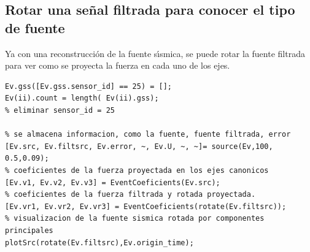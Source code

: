\subsection{Rotar una señal filtrada para conocer el tipo de fuente}
Ya con una reconstrucción de la fuente s\'{\i}smica, se puede rotar la fuente
filtrada para ver como se proyecta la fuerza en cada uno de los ejes.
\begin{verbatim}
Ev.gss([Ev.gss.sensor_id] == 25) = [];
Ev(ii).count = length( Ev(ii).gss);
% eliminar sensor_id = 25

% se almacena informacion, como la fuente, fuente filtrada, error
[Ev.src, Ev.filtsrc, Ev.error, ~, Ev.U, ~, ~]= source(Ev,100, 0.5,0.09);  
% coeficientes de la fuerza proyectada en los ejes canonicos 
[Ev.v1, Ev.v2, Ev.v3] = EventCoeficients(Ev.src);
% coeficientes de la fuerza filtrada y rotada proyectada.
[Ev.vr1, Ev.vr2, Ev.vr3] = EventCoeficients(rotate(Ev.filtsrc));
% visualizacion de la fuente sismica rotada por componentes principales
plotSrc(rotate(Ev.filtsrc),Ev.origin_time);
\end{verbatim} 
